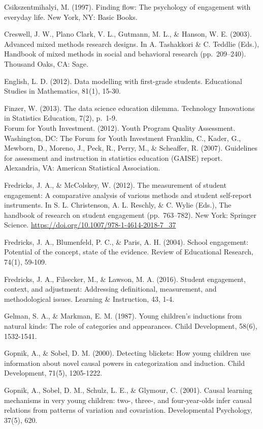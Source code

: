 \documentclass[]{book}
\theoremstyle{definition}
\theoremstyle{definition}
\theoremstyle{definition}
\theoremstyle{remark}
\begin{document}
Csikszentmihalyi, M. (1997). Finding flow: The psychology of engagement
with everyday life. New York, NY: Basic Books.

Creswell, J. W., Plano Clark, V. L., Gutmann, M. L., \& Hanson, W. E.
(2003). Advanced mixed methods research designs. In A. Tashakkori \& C.
Teddlie (Eds.), Handbook of mixed methods in social and behavioral
research (pp.~209--240). Thousand Oaks, CA: Sage.

English, L. D. (2012). Data modelling with first-grade students.
Educational Studies in Mathematics, 81(1), 15-30.

Finzer, W. (2013). The data science education dilemma. Technology
Innovations in Statistics Education, 7(2), p.~1-9.\\
Forum for Youth Investment. (2012). Youth Program Quality Assessment.
Washington, DC: The Forum for Youth Investment Franklin, C., Kader, G.,
Mewborn, D., Moreno, J., Peck, R., Perry, M., \& Scheaffer, R. (2007).
Guidelines for assessment and instruction in statistics education
(GAISE) report. Alexandria, VA: American Statistical Association.

Fredricks, J. A., \& McColskey, W. (2012). The measurement of student
engagement: A comparative analysis of various methods and student
self-report instruments. In S. L. Christenson, A. L. Reschly, \& C.
Wylie (Eds.), The handbook of research on student engagement
(pp.~763--782). New York: Springer Science.
\url{https://doi.org/10.1007/978-1-4614-2018-7_37}

Fredricks, J. A., Blumenfeld, P. C., \& Paris, A. H. (2004). School
engagement: Potential of the concept, state of the evidence. Review of
Educational Research, 74(1), 59-109.

Fredricks, J. A., Filsecker, M., \& Lawson, M. A. (2016). Student
engagement, context, and adjustment: Addressing definitional,
measurement, and methodological issues. Learning \& Instruction, 43,
1-4.

Gelman, S. A., \& Markman, E. M. (1987). Young children's inductions
from natural kinds: The role of categories and appearances. Child
Development, 58(6), 1532-1541.

Gopnik, A., \& Sobel, D. M. (2000). Detecting blickets: How young
children use information about novel causal powers in categorization and
induction. Child Development, 71(5), 1205-1222.

Gopnik, A., Sobel, D. M., Schulz, L. E., \& Glymour, C. (2001). Causal
learning mechanisms in very young children: two-, three-, and
four-year-olds infer causal relations from patterns of variation and
covariation. Developmental Psychology, 37(5), 620.
\end{document}
